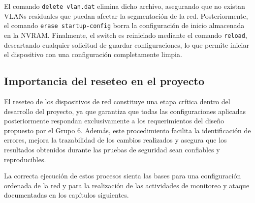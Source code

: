 El comando \texttt{delete vlan.dat} elimina dicho archivo, asegurando que no existan VLANs residuales que puedan afectar la segmentación de la red. Posteriormente, el comando \texttt{erase startup-config} borra la configuración de inicio almacenada en la NVRAM. Finalmente, el switch es reiniciado mediante el comando \texttt{reload}, descartando cualquier solicitud de guardar configuraciones, lo que permite iniciar el dispositivo con una configuración completamente limpia.

\subsection{Importancia del reseteo en el proyecto}

El reseteo de los dispositivos de red constituye una etapa crítica dentro del desarrollo del proyecto, ya que garantiza que todas las configuraciones aplicadas posteriormente respondan exclusivamente a los requerimientos del diseño propuesto por el Grupo 6. Además, este procedimiento facilita la identificación de errores, mejora la trazabilidad de los cambios realizados y asegura que los resultados obtenidos durante las pruebas de seguridad sean confiables y reproducibles.

La correcta ejecución de estos procesos sienta las bases para una configuración ordenada de la red y para la realización de las actividades de monitoreo y ataque documentadas en los capítulos siguientes.
